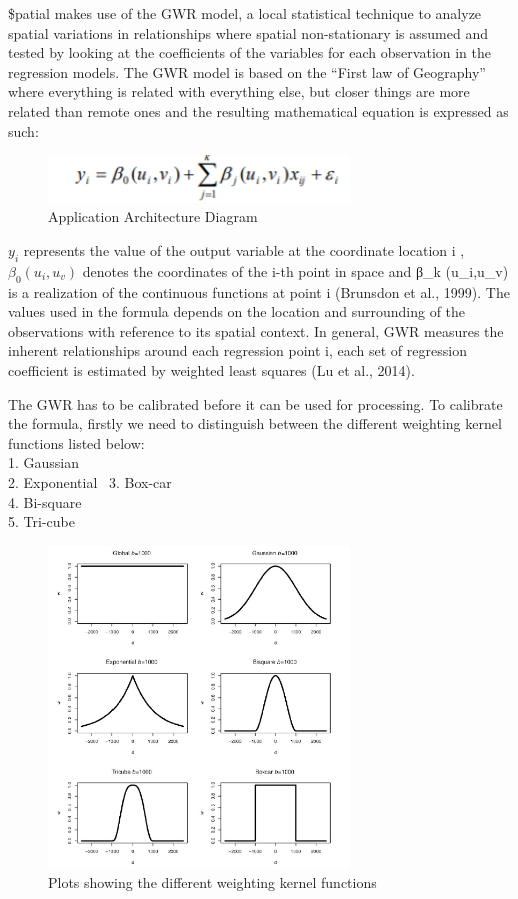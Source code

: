 \documentclass{acm_proc_article-sp}
\begin{document}
\$patial makes use of the GWR model, a local statistical technique to
analyze spatial variations in relationships where spatial non-stationary
is assumed and tested by looking at the coefficients of the variables
for each observation in the regression models. The GWR model is based on
the ``First law of Geography'' where everything is related with
everything else, but closer things are more related than remote ones and
the resulting mathematical equation is expressed as such:\\

\begin{figure}[h]
\centering
\includegraphics[width=8cm]{Eqn 1.png}
\caption{Application Architecture Diagram}\label{fig2}
\end{figure}

\(y_i\) represents the value of the output variable at the coordinate
location i , \(β_0 (u_i,u_v)\) denotes the coordinates of the i-th point
in space and β\_k (u\_i,u\_v) is a realization of the continuous
functions at point i (Brunsdon et al., 1999). The values used in the
formula depends on the location and surrounding of the observations with
reference to its spatial context. In general, GWR measures the inherent
relationships around each regression point i, each set of regression
coefficient is estimated by weighted least squares (Lu et al., 2014).

The GWR has to be calibrated before it can be used for processing. To
calibrate the formula, firstly we need to distinguish between the
different weighting kernel functions listed below:\\
1. Gaussian\\
2. Exponential~ 3. Box-car\\
4. Bi-square\\
5. Tri-cube\\

\begin{figure}[h]
\centering
\includegraphics[width=8cm]{function.png}
\caption{Plots showing the different weighting kernel functions}\label{fig3}
\end{figure}
\end{document}
